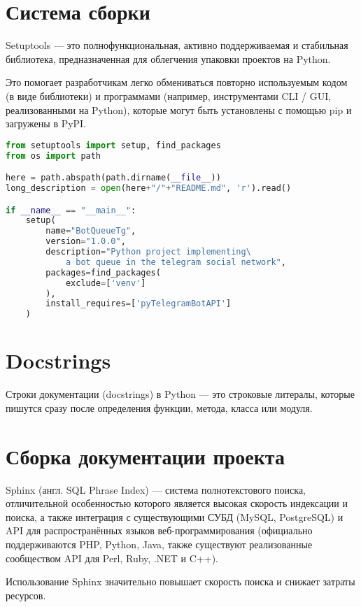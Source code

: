 \section{Система сборки}
Setuptools --- это полнофункциональная, активно поддерживаемая
и стабильная библиотека, предназначенная для облегчения упаковки
проектов на Python.

Это помогает разработчикам легко обмениваться повторно используемым кодом
(в виде библиотеки) и программами (например, инструментами CLI / GUI,
реализованными на Python), которые могут быть установлены с помощью pip
и загружены в PyPI.

\begin{lstlisting}[language=Python
	, caption=\leftline{Текст файла setup.py}
	, label=lst:setup]
from setuptools import setup, find_packages
from os import path

here = path.abspath(path.dirname(__file__))
long_description = open(here+"/"+"README.md", 'r').read()

if __name__ == "__main__":
	setup(
		name="BotQueueTg",
		version="1.0.0",
		description="Python project implementing\
			a bot queue in the telegram social network",
		packages=find_packages(
			exclude=['venv']
		),
		install_requires=['pyTelegramBotAPI']
	)
\end{lstlisting}

\section{Docstrings}
Строки документации (docstrings) в Python --- это строковые литералы,
которые пишутся сразу после определения функции, метода, класса или модуля.

\section{Сборка документации проекта}
Sphinx (англ. SQL Phrase Index) --- система полнотекстового поиска,
отличительной особенностью которого является высокая скорость индексации
и поиска, а также интеграция с существующими СУБД (MySQL, PostgreSQL)
и API для распространённых языков веб-программирования
(официально поддерживаются PHP, Python, Java, также существуют реализованные
сообществом API для Perl, Ruby, .NET и C++).\par
Использование Sphinx значительно повышает скорость поиска и снижает
затраты ресурсов.

